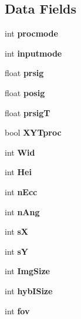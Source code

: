 \subsection*{Data Fields}
\begin{DoxyCompactItemize}
\item 
int {\bfseries procmode}\label{classoFlow_a2d316553e9d3ba757e2c6c10a9639d4c}

\item 
int {\bfseries inputmode}\label{classoFlow_a41c1cd4ab56f4ae7114ef2b6ebd1ad66}

\item 
float {\bfseries prsig}\label{classoFlow_a281c98ae9ba8ea742d84a9323a7897d8}

\item 
float {\bfseries posig}\label{classoFlow_adde37ea30daa9e1ebf5db1f21300897d}

\item 
float {\bfseries prsig\+T}\label{classoFlow_aa575b63d699277abd6f1bdb08bbfee91}

\item 
bool {\bfseries X\+Y\+Tproc}\label{classoFlow_a295048465436451c47fa9fe5f88530b2}

\item 
int {\bfseries Wid}\label{classoFlow_a0f86a7d61719c9266cdae13da333124d}

\item 
int {\bfseries Hei}\label{classoFlow_a8b7bf7dc4e585f7a744f1e92b444b1da}

\item 
int {\bfseries n\+Ecc}\label{classoFlow_a7acc3dc9bf2c09c7599fe662865983c4}

\item 
int {\bfseries n\+Ang}\label{classoFlow_a6f57d8924cbe869bbf1f6e539f4f8583}

\item 
int {\bfseries s\+X}\label{classoFlow_a4afe774e1d44353a5642732889694b57}

\item 
int {\bfseries s\+Y}\label{classoFlow_a501af747fa4beb9733222b867997e227}

\item 
int {\bfseries Img\+Size}\label{classoFlow_a2637174572399ea11e929eb0c75a6607}

\item 
int {\bfseries hyb\+I\+Size}\label{classoFlow_a95e3fcb8a4257f44b87b739e8956d1d7}

\item 
int {\bfseries fov}\label{classoFlow_a391e54b0b5375d1ed234160163b62f9a}


\end{DoxyCompactItemize}
